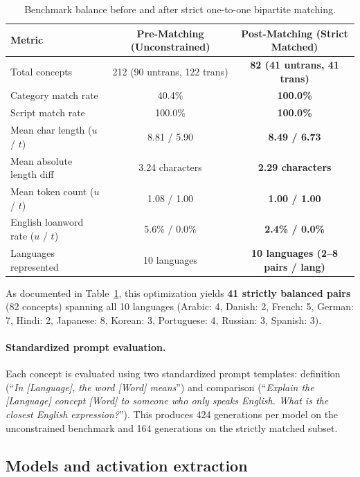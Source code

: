 \documentclass{article}
\begin{document}
\begin{table}[t]
\centering
\footnotesize
\setlength{\tabcolsep}{6pt}
\begin{tabular}{lcc}
\toprule
Metric & Pre-Matching (Unconstrained) & Post-Matching (Strict Matched) \\
\midrule
Total concepts & 212 (90 untrans, 122 trans) & \textbf{82 (41 untrans, 41 trans)} \\
Category match rate & 40.4\% & \textbf{100.0\%} \\
Script match rate & 100.0\% & \textbf{100.0\%} \\
Mean char length ($u$ / $t$) & 8.81 / 5.90 & \textbf{8.49 / 6.73} \\
Mean absolute length diff & 3.24 characters & \textbf{2.29 characters} \\
Mean token count ($u$ / $t$) & 1.08 / 1.00 & \textbf{1.00 / 1.00} \\
English loanword rate ($u$ / $t$) & 5.6\% / 0.0\% & \textbf{2.4\% / 0.0\%} \\
Languages represented & 10 languages & \textbf{10 languages (2--8 pairs / lang)} \\
\bottomrule
\end{tabular}
\vspace{1ex}
\caption{Benchmark balance before and after strict one-to-one bipartite matching.}
\label{tab:matching_balance}
\end{table}

As documented in Table~\ref{tab:matching_balance}, this optimization yields \textbf{41 strictly balanced pairs} (82 concepts) spanning all 10 languages (Arabic: 4, Danish: 2, French: 5, German: 7, Hindi: 2, Japanese: 8, Korean: 3, Portuguese: 4, Russian: 3, Spanish: 3).

\paragraph{Standardized prompt evaluation.}
Each concept is evaluated using two standardized prompt templates: definition (``\textit{In [Language], the word [Word] means}'') and comparison (``\textit{Explain the [Language] concept [Word] to someone who only speaks English. What is the closest English expression?}''). This produces 424 generations per model on the unconstrained benchmark and 164 generations on the strictly matched subset.

\subsection{Models and activation extraction}
\end{document}
